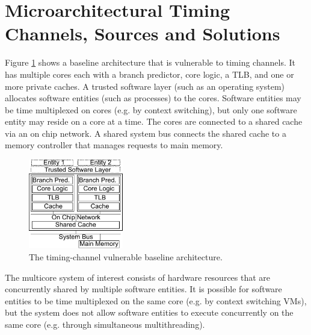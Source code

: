 \section{Microarchitectural Timing Channels, Sources and Solutions}
Figure \ref{fig:baseline} shows a baseline architecture that is vulnerable to 
timing channels. It has multiple cores each with a branch predictor, core 
logic, a TLB, and one or more private caches. A trusted software layer (such as 
an operating system) allocates software entities (such as processes) to the 
cores. Software entities may be time multiplexed on cores (e.g. by context 
switching), but only one software entity may reside on a core at a time. The 
cores are connected to a shared cache via an on chip network. A shared system 
bus connects the shared cache to a memory controller that manages requests to 
main memory.
    \begin{figure}
        \begin{center}
            \includegraphics[width=1.62in]{figs/baseline.pdf}
            \caption{The timing-channel vulnerable baseline architecture.}
            \label{fig:baseline}
        \end{center}
    \end{figure}

The multicore system of interest consists of hardware resources that are
concurrently shared by multiple software entities. It is possible for software 
entities to be time multiplexed on the same core (e.g.  by context switching 
VMs), but the system does not allow software entities to execute concurrently 
on the same core (e.g. through simultaneous multithreading). 

